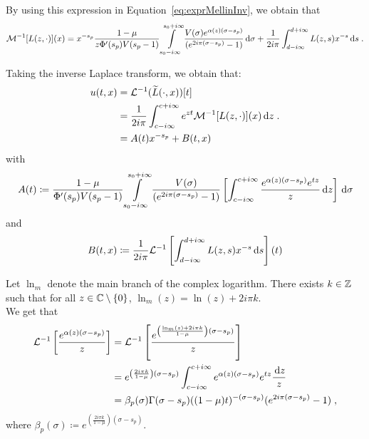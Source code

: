 By using this expression in Equation~\eqref{eq:exprMellinInv}, we obtain that 
\begin{equation*}
    \mathcal{M}^{-1}[L(z,\cdot)](x) 
    = x^{-s_p}\frac{1-\mu}{z \Phi'(s_p) V(s_p-1)}
     \int\limits_{s_0-i\infty}^{s_0+i\infty}
     \frac{V(\sigma) e^{ \alpha(z)(\sigma-s_p)}
  }{(e^{2i\pi(\sigma-s_p)}-1)}\,\mathrm{d} \sigma + \frac{1}{2i\pi} \int_{d-i\infty}^{d+i\infty} L(z,s)x^{-s}\,\mathrm{d} s
    \; .
\end{equation*}

Taking the inverse Laplace transform, we obtain that: 
\begin{align*}
     u(t,x) &= \mathcal{L}^{-1}(\widetilde L(\cdot, x))[t] \\
     &= \frac{1}{2i\pi } \int_{c-i\infty}^{c+i\infty} e^{zt}\mathcal{M}^{-1}[L(z,\cdot)](x) \,\mathrm{d} z
     \; .\\
     &= A(t)x^{-s_p} + B(t,x)
\end{align*}
with 
\begin{equation}
    A(t) \coloneqq\frac{1-\mu}{\Phi'(s_p) V(s_p-1)}
     \int\limits_{s_0-i\infty}^{s_0+i\infty}
     \frac{V(\sigma)
  }{(e^{2i\pi(\sigma-s_p)}-1)} \left[\int_{c-i\infty}^{c+i\infty} \frac{e^{ \alpha(z)(\sigma-s_p)}e^{tz}}{z}\,\mathrm{d} z \right] \,\mathrm{d} \sigma
  \label{def:A} 
\end{equation}
and 
\begin{equation}
    B(t,x) \coloneqq \frac{1}{2i\pi} \mathcal{L}^{-1}\left[\int_{d-i\infty}^{d+i\infty} L(z,s)x^{-s}\,\mathrm{d} s \right] (t)
\label{def:B}
\end{equation}

Let $\ln_{m}$ denote the main branch of the complex logarithm. There exists $k \in \mathbb{Z}$ such that for all $z \in \mathbb{C} \setminus \{0\}$, $\ln_m(z) = \ln(z) + 2i\pi k. $ \\
We get that 
\begin{subequations}
\begin{align}
    \mathcal{L}^{-1}\left[ \frac{e^{ \alpha(z)(\sigma-s_p)}}{z}  \right]
    &= 
    \mathcal{L}^{-1}\left[ \frac{e^{ \left( \frac{\ln_m(z) + 2i\pi k}{1-\mu} \right) (\sigma-s_p)}}{z}  \right] \\
    &= 
    e^{ \left( \frac{2i\pi k}{1-\mu} \right) (\sigma-s_p)}
    \int_{c-i\infty}^{c+i\infty} e^{ \alpha(z)(\sigma-s_p)}e^{tz}\frac{\,\mathrm{d} z}{z}\\
    &= \beta_p(\sigma) \Gamma(\sigma-s_p)((1-\mu)t)^{-(\sigma-s_p)}(e^{2i\pi(\sigma-s_p)}-1)
    \; ,
    \label{eq:4.24}
\end{align}
\label{eq:calcLaplInv}
\end{subequations}
where $\beta_p(\sigma) \coloneqq e^{ \left( \frac{2i\pi k}{1-\mu} \right) (\sigma-s_p)}$. 


